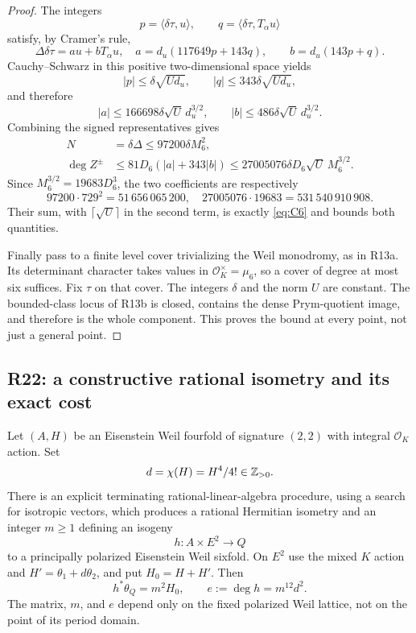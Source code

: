 \begin{proof}
The integers
\[
p=\langle\delta\tau,u\rangle,\qquad
q=\langle\delta\tau,T_\alpha u\rangle
\]
satisfy, by Cramer's rule,
\[
\Delta\delta\tau=a u+bT_\alpha u,
\quad
a=d_u(117649p+143q),\qquad
b=d_u(143p+q).
\]
Cauchy--Schwarz in this positive two-dimensional space yields
\[
|p|\leq\delta\sqrt{Ud_u},\qquad
|q|\leq343\delta\sqrt{Ud_u},
\]
and therefore
\[
|a|\leq166698\delta\sqrt U\,d_u^{3/2},\qquad
|b|\leq486\delta\sqrt U\,d_u^{3/2}.
\]
Combining the signed representatives gives
\begin{align*}
N&=\delta\Delta\leq97200\delta M_6^2,\\
\deg Z^\pm&\leq81D_6(|a|+343|b|)
\leq27005076\delta D_6\sqrt U\,M_6^{3/2}.
\end{align*}
Since $M_6^{3/2}=19683D_6^3$, the two coefficients are respectively
\[
97200\cdot729^2=51\,656\,065\,200,
\quad
27005076\cdot19683=531\,540\,910\,908.
\]
Their sum, with $\lceil\sqrt U\rceil$ in the second term, is exactly \eqref{eq:C6} and bounds both quantities.

Finally pass to a finite level cover trivializing the Weil monodromy, as in R13a. Its determinant character takes values in $\mathcal O_K^\times=\mu_6$, so a cover of degree at most six suffices. Fix $\tau$ on that cover. The integers $\delta$ and the norm $U$ are constant. The bounded-class locus of R13b is closed, contains the dense Prym-quotient image, and therefore is the whole component. This proves the bound at every point, not just a general point.
\end{proof}

\subsection{R22: a constructive rational isometry and its exact cost}

\begin{proposition}[R22]
\label{prop:R22}
Let $(A,H)$ be an Eisenstein Weil fourfold of signature $(2,2)$ with integral $\mathcal O_K$ action. Set
\[
d=\chi(H)=H^4/4!\in\mathbb Z_{>0}.
\]
There is an explicit terminating rational-linear-algebra procedure, using a search for isotropic vectors, which produces a rational Hermitian isometry and an integer $m\geq1$ defining an isogeny
\[
h:A\times E^2\longrightarrow Q
\]
to a principally polarized Eisenstein Weil sixfold. On $E^2$ use the mixed $K$ action and $H'=\theta_1+d\theta_2$, and put $H_0=H+H'$. Then
\begin{equation}
h^*\theta_Q=m^2H_0,\qquad
e:=\deg h=m^{12}d^2.
\label{eq:comp-isogeny}
\end{equation}
The matrix, $m$, and $e$ depend only on the fixed polarized Weil lattice, not on the point of its period domain.
\end{proposition}

